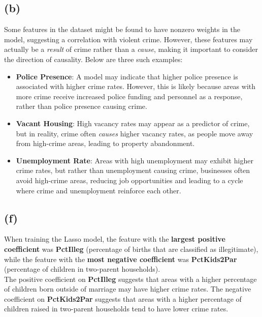 \documentclass{article}
\begin{document}
\subsection*{(b)}

Some features in the dataset might be found to have nonzero weights in the model, suggesting a correlation with violent crime. However, these features may actually be a \textit{result} of crime rather than a \textit{cause}, making it important to consider the direction of causality. Below are three such examples:

\begin{itemize}
    \item \textbf{Police Presence}:  
    A model may indicate that higher police presence is associated with higher crime rates. However, this is likely because areas with more crime receive increased police funding and personnel as a response, rather than police presence causing crime.

    \item \textbf{Vacant Housing}:  
    High vacancy rates may appear as a predictor of crime, but in reality, crime often \textit{causes} higher vacancy rates, as people move away from high-crime areas, leading to property abandonment.

    \item \textbf{Unemployment Rate}:  
    Areas with high unemployment may exhibit higher crime rates, but rather than unemployment causing crime, businesses often avoid high-crime areas, reducing job opportunities and leading to a cycle where crime and unemployment reinforce each other.
\end{itemize}

\subsection*{(f)}

When training the Lasso model, the feature with the \textbf{largest positive coefficient} was \textbf{PctIlleg} (percentage of births that are classified as illegitimate), while the feature with the \textbf{most negative coefficient} was \textbf{PctKids2Par} (percentage of children in two-parent households). \\

\noindent The positive coefficient on \textbf{PctIlleg} suggests that areas with a higher percentage of children born outside of marriage may have higher crime rates. The negative coefficient on \textbf{PctKids2Par} suggests that areas with a higher percentage of children raised in two-parent households tend to have lower crime rates.
\end{document}
